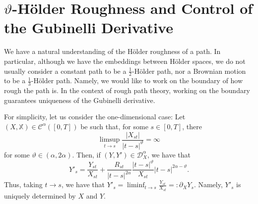 \documentclass[]{article}
\theoremstyle{definition}
\theoremstyle{definition}
\let\theta\vartheta
\begin{document}
\section*{\(\theta\)-H\"older Roughness and Control of the Gubinelli Derivative}

We have a natural understanding of the H\"older roughness of a path. In particular, although we 
have the embeddings between H\"older spaces, we do not usually consider a constant path to be 
a \(\frac{1}{2}\)-H\"older path, nor a Brownian motion to be a \(\frac{1}{3}\)-H\"older path.
Namely, we would like to work on the boundary of how rough the path is. In the context of rough 
path theory, working on the boundary guarantees uniqueness of the Gubinelli derivative. 

For simplicity, let us consider the one-dimensional case: Let 
\((X, \mathbb{X}) \in \mathcal{C}^\alpha([0, T])\) be such that, for some \(s \in [0, T]\), there 
\[\limsup_{t \to s} \frac{|X_{st}|}{|t - s|^{\theta}} = \infty\]
for some \(\theta \in (\alpha, 2 \alpha)\). Then, if \((Y, Y') \in \mathcal{D}^\alpha_X\), we have 
that 
\[Y'_s = \frac{Y_{st}}{X_{st}} + \frac{R_{st}}{|t - s|^{2\alpha}} \frac{|t - s|^\theta}{X_{st}} |t - s|^{2\alpha - \theta}.\]
Thus, taking \(t \to s\), we have that \(Y'_s = \liminf_{t \to s} \frac{Y_{st}}{X_{st}} =: \partial_X Y_s\).
Namely, \(Y'_s\) is uniquely determined by \(X\) and \(Y\).
\end{document}
